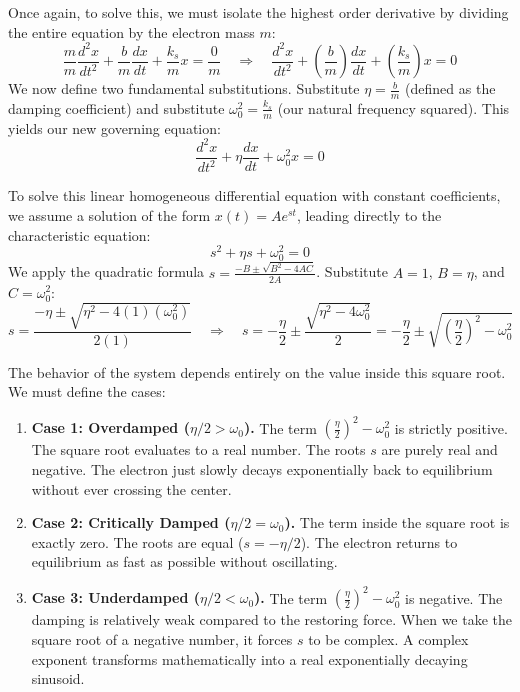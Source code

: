 Once again, to solve this, we must isolate the highest order derivative by dividing the entire equation by the electron mass $m$:
\begin{equation*}
    \frac{m}{m}\frac{d^2x}{dt^2}+\frac{b}{m}\frac{dx}{dt}+\frac{k_s}{m}x= \frac{0}{m} \quad \Rightarrow \quad \frac{d^2x}{dt^2}+\left(\frac{b}{m}\right)\frac{dx}{dt}+\left(\frac{k_s}{m}\right)x=0
\end{equation*}
We now define two fundamental substitutions. Substitute $\eta = \frac{b}{m}$ (defined as the damping coefficient) and substitute $\omega_0^2 = \frac{k_s}{m}$ (our natural frequency squared). This yields our new governing equation:
\begin{equation*}
    \frac{d^2x}{dt^2}+\eta\frac{dx}{dt}+\omega_0^2x=0
\end{equation*}

To solve this linear homogeneous differential equation with constant coefficients, we assume a solution of the form $x(t) = Ae^{st}$, leading directly to the characteristic equation:
\begin{equation*}
    s^2 + \eta s + \omega_0^2 = 0
\end{equation*}
We apply the quadratic formula $s = \frac{-B \pm \sqrt{B^2 - 4AC}}{2A}$. Substitute $A=1$, $B=\eta$, and $C=\omega_0^2$:
\begin{equation*}
    s = \frac{-\eta \pm \sqrt{\eta^2 - 4(1)(\omega_0^2)}}{2(1)} \quad \Rightarrow \quad s = -\frac{\eta}{2} \pm \frac{\sqrt{\eta^2 - 4\omega_0^2}}{2} = -\frac{\eta}{2} \pm \sqrt{\left(\frac{\eta}{2}\right)^2 - \omega_0^2}
\end{equation*}

The behavior of the system depends entirely on the value inside this square root. We must define the cases:
\begin{enumerate}
    \item \textbf{Case 1: Overdamped ($\eta/2 > \omega_0$).} The term $\left(\frac{\eta}{2}\right)^2 - \omega_0^2$ is strictly positive. The square root evaluates to a real number. The roots $s$ are purely real and negative. The electron just slowly decays exponentially back to equilibrium without ever crossing the center.
    \item \textbf{Case 2: Critically Damped ($\eta/2 = \omega_0$).} The term inside the square root is exactly zero. The roots are equal ($s=-\eta/2$). The electron returns to equilibrium as fast as possible without oscillating.
    \item \textbf{Case 3: Underdamped ($\eta/2 < \omega_0$).} The term $\left(\frac{\eta}{2}\right)^2 - \omega_0^2$ is negative. The damping is relatively weak compared to the restoring force. When we take the square root of a negative number, it forces $s$ to be complex. A complex exponent transforms mathematically into a real exponentially decaying sinusoid.
\end{enumerate}

